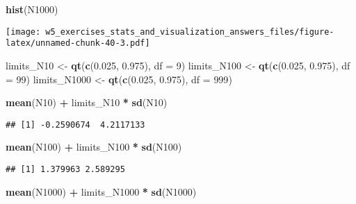 \documentclass[]{article}
\newenvironment{Shaded}{\begin{snugshade}}{\end{snugshade}}
\newcommand{\DataTypeTok}[1]{\textcolor[rgb]{0.13,0.29,0.53}{#1}}
\newcommand{\DecValTok}[1]{\textcolor[rgb]{0.00,0.00,0.81}{#1}}
\newcommand{\FloatTok}[1]{\textcolor[rgb]{0.00,0.00,0.81}{#1}}
\newcommand{\KeywordTok}[1]{\textcolor[rgb]{0.13,0.29,0.53}{\textbf{#1}}}
\newcommand{\NormalTok}[1]{#1}
\newcommand{\OperatorTok}[1]{\textcolor[rgb]{0.81,0.36,0.00}{\textbf{#1}}}
\newcommand{\StringTok}[1]{\textcolor[rgb]{0.31,0.60,0.02}{#1}}
\begin{document}
\begin{Shaded}
\begin{Highlighting}[]
\KeywordTok{hist}\NormalTok{(N1000)}
\end{Highlighting}
\end{Shaded}

\texttt{[image: w5\_exercises\_stats\_and\_visualization\_answers\_files/figure-latex/unnamed-chunk-40-3.pdf]}

\begin{Shaded}
\begin{Highlighting}[]
\NormalTok{limits_N10 <-}\StringTok{ }\KeywordTok{qt}\NormalTok{(}\KeywordTok{c}\NormalTok{(}\FloatTok{0.025}\NormalTok{, }\FloatTok{0.975}\NormalTok{), }\DataTypeTok{df =} \DecValTok{9}\NormalTok{)}
\NormalTok{limits_N100 <-}\StringTok{ }\KeywordTok{qt}\NormalTok{(}\KeywordTok{c}\NormalTok{(}\FloatTok{0.025}\NormalTok{, }\FloatTok{0.975}\NormalTok{), }\DataTypeTok{df =} \DecValTok{99}\NormalTok{)}
\NormalTok{limits_N1000 <-}\StringTok{ }\KeywordTok{qt}\NormalTok{(}\KeywordTok{c}\NormalTok{(}\FloatTok{0.025}\NormalTok{, }\FloatTok{0.975}\NormalTok{), }\DataTypeTok{df =} \DecValTok{999}\NormalTok{)}

\KeywordTok{mean}\NormalTok{(N10) }\OperatorTok{+}\StringTok{ }\NormalTok{limits_N10 }\OperatorTok{*}\StringTok{ }\KeywordTok{sd}\NormalTok{(N10)}
\end{Highlighting}
\end{Shaded}

\begin{verbatim}
## [1] -0.2590674  4.2117133
\end{verbatim}

\begin{Shaded}
\begin{Highlighting}[]
\KeywordTok{mean}\NormalTok{(N100) }\OperatorTok{+}\StringTok{ }\NormalTok{limits_N100 }\OperatorTok{*}\StringTok{ }\KeywordTok{sd}\NormalTok{(N100)}
\end{Highlighting}
\end{Shaded}

\begin{verbatim}
## [1] 1.379963 2.589295
\end{verbatim}

\begin{Shaded}
\begin{Highlighting}[]
\KeywordTok{mean}\NormalTok{(N1000) }\OperatorTok{+}\StringTok{ }\NormalTok{limits_N1000 }\OperatorTok{*}\StringTok{ }\KeywordTok{sd}\NormalTok{(N1000)}
\end{Highlighting}
\end{Shaded}
\end{document}
